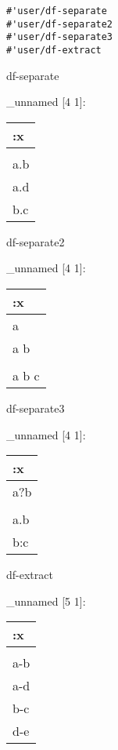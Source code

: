 \documentclass[]{article}
\newenvironment{Shaded}{\begin{snugshade}}{\end{snugshade}}
\newcommand{\NormalTok}[1]{#1}
\begin{document}
\begin{verbatim}
#'user/df-separate
#'user/df-separate2
#'user/df-separate3
#'user/df-extract
\end{verbatim}

\begin{Shaded}
\begin{Highlighting}[]
\NormalTok{df-separate}
\end{Highlighting}
\end{Shaded}

\_unnamed {[}4 1{]}:

\begin{longtable}[]{@{}l@{}}
\toprule
:x\tabularnewline
\midrule
\endhead
\tabularnewline
a.b\tabularnewline
a.d\tabularnewline
b.c\tabularnewline
\bottomrule
\end{longtable}

\begin{Shaded}
\begin{Highlighting}[]
\NormalTok{df-separate2}
\end{Highlighting}
\end{Shaded}

\_unnamed {[}4 1{]}:

\begin{longtable}[]{@{}l@{}}
\toprule
:x\tabularnewline
\midrule
\endhead
a\tabularnewline
a b\tabularnewline
\tabularnewline
a b c\tabularnewline
\bottomrule
\end{longtable}

\begin{Shaded}
\begin{Highlighting}[]
\NormalTok{df-separate3}
\end{Highlighting}
\end{Shaded}

\_unnamed {[}4 1{]}:

\begin{longtable}[]{@{}l@{}}
\toprule
:x\tabularnewline
\midrule
\endhead
a?b\tabularnewline
\tabularnewline
a.b\tabularnewline
b:c\tabularnewline
\bottomrule
\end{longtable}

\begin{Shaded}
\begin{Highlighting}[]
\NormalTok{df-extract}
\end{Highlighting}
\end{Shaded}

\_unnamed {[}5 1{]}:

\begin{longtable}[]{@{}l@{}}
\toprule
:x\tabularnewline
\midrule
\endhead
\tabularnewline
a-b\tabularnewline
a-d\tabularnewline
b-c\tabularnewline
d-e\tabularnewline
\bottomrule
\end{longtable}
\end{document}
